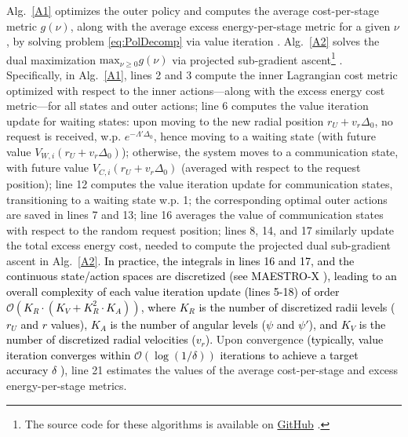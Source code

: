 \documentclass[12pt, draftcls, onecolumn]{IEEEtran}
\theoremstyle{plain}
\theoremstyle{definition}
\theoremstyle{remark}
\newcommand\hlt[1]{\textcolor{black}{#1}}
\begin{document}
Alg.~\ref{A1} optimizes the outer policy and computes the average cost-per-stage metric $g(\nu)$, along with the average excess energy-per-stage metric for a given $\nu$, by solving problem \eqref{eq:PolDecomp} via value iteration \cite{Bertsekas}. Alg.~\ref{A2} solves the dual maximization $\mathrm{max}_{\nu{\geq}0}g(\nu)$ via projected sub-gradient ascent\footnote{The source code for these algorithms is available on \href{https://github.com/bharathkeshavamurthy/MAESTRO-X.git}{GitHub} \cite{MAESTRO-X}.} \cite{SubgradientMethods}. Specifically, in Alg.~\ref{A1}, lines 2 and 3 compute the inner Lagrangian cost metric optimized with respect to the inner actions---along with the excess energy cost metric---for all states and outer actions; line 6 computes the value iteration update for waiting states:
upon moving to the new radial position $r_{U}{+}v_{r}\Delta_{0}$, 
no request is received, w.p. $e^{-\Lambda'\Delta_{0}}$, hence moving to a waiting state (with future value $V_{W,i}(r_{U}{+}v_{r}\Delta_{0})$); otherwise, the system moves to a communication state, with future value $V_{C,i}(r_{U}{+}v_{r}\Delta_{0})$ (averaged with respect to the request position); line 12 computes the value iteration update for communication states, transitioning to a waiting state w.p. 1; the corresponding optimal outer actions are saved in lines 7 and 13; line 16 averages the value of communication states with respect to the random request position; lines 8, 14, and 17 similarly update the total excess energy cost, needed to compute the projected dual sub-gradient ascent in Alg.~\ref{A2}.
\label{discretizeVI}\hlt{In practice, the integrals in lines 16 and 17, and the continuous state/action spaces are discretized (see MAESTRO-X \cite{MAESTRO-X}), leading to an overall complexity of each value iteration update (lines 5-18) of order $\mathcal O(K_R\cdot(K_V+K_R^2\cdot K_A))$, where $K_R$ is the number of discretized radii levels ($r_U$ and $r$ values), $K_A$ is the number of angular levels ($\psi$ and $\psi'$), and $K_V$ is the number of discretized radial velocities ($v_r$).} Upon convergence \hlt{(typically, value iteration converges within $\mathcal O(\log(1/\delta))$ iterations to achieve a target accuracy $\delta$ \cite[Sec. V]{Bertsekas})}, line 21 estimates the values of the average cost-per-stage and excess energy-per-stage metrics.
\end{document}
